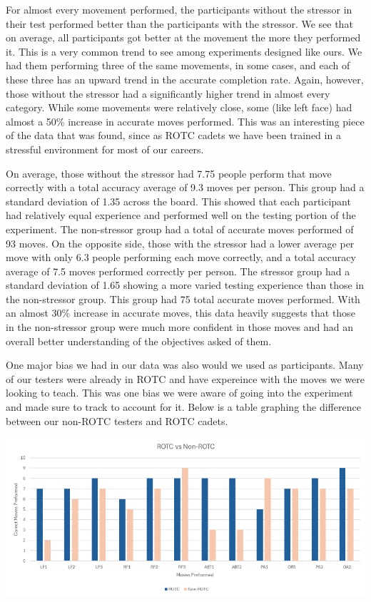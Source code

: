 \documentclass[manuscript,screen,review]{acmart}
\begin{document}
For almost every movement performed, the participants without the stressor in their test performed better than the 
participants with the stressor. We see that on average, all participants got better at the movement the more they 
performed it. This is a very common trend to see among experiments designed like ours. We had them performing 
three of the same movements, in some cases, and each of these three has an upward trend in the accurate completion 
rate. Again, however, those without the stressor had a significantly higher trend in almost every category. While 
some movements were relatively close, some (like left face) had almost a 50\% increase 
in accurate moves performed. This was an interesting piece of the data that was found, since as ROTC cadets we have 
been trained in a stressful environment for most of our careers.  

On average, those without the stressor had 7.75 people perform that move correctly with a total accuracy average of 
9.3 moves per person. This group had a standard deviation of 1.35 across the board. This showed that each participant 
had relatively equal experience and performed well on the testing portion of the experiment. The non-stressor group 
had a total of accurate moves performed of 93 moves. On the opposite side, those with the stressor had a lower average 
per move with only 6.3 people performing each move correctly, and a total accuracy average of 7.5 moves performed 
correctly per person. The stressor group had a standard deviation of 1.65 showing a more varied testing experience 
than those in the non-stressor group. This group had 75 total accurate moves performed. With an almost 30\% 
increase in accurate moves, this data heavily suggests that those in the non-stressor group were much more confident 
in those moves and had an overall better understanding of the objectives asked of them.  

One major bias we had in our data was also would we used as participants. Many of our testers were already in ROTC 
and have expereince with the moves we were looking to teach. This was one bias we were aware of going into the 
experiment and made sure to track to account for it. Below is a table graphing the difference between our non-ROTC 
testers and ROTC cadets.

\includegraphics[scale=0.8]{ROTCGraph}
\end{document}
